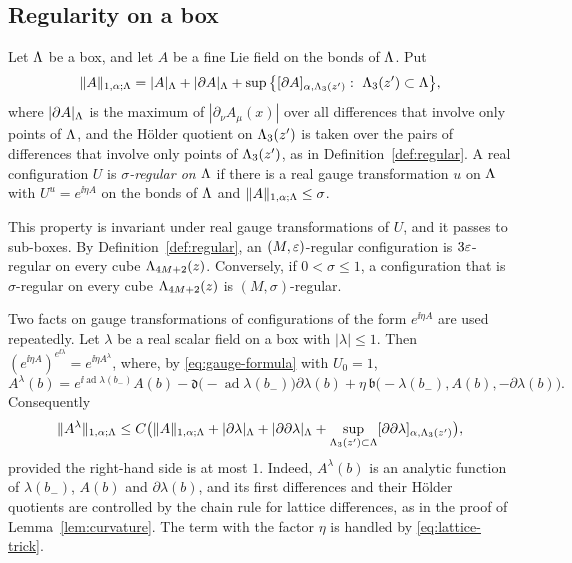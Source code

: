 \subsection{Regularity on a box}\label{ss:28.1}

\begin{definition}\label{def:box-regular}
Let $\Lambda$ be a box, and let $A$ be a fine Lie field on the bonds of $\Lambda$. Put
\[
\|A\|_{1,\alpha;\Lam}=|A|_\Lam+|\partial A|_\Lam+\sup\big\{\Hol{\partial A}{\Lam_3(z')}:\ \Lam_3(z')\subset\Lam\big\},
\]
where $|\partial A|_\Lambda$ is the maximum of $|\partial_\nu A_\mu(x)|$ over all differences that involve only points of $\Lambda$, and the H\"older quotient on $\Lambda_3(z')$ is taken over the pairs of differences that involve only points of $\Lambda_3(z')$, as in Definition~\ref{def:regular}. A real configuration $U$ is \emph{$\sigma$-regular on $\Lambda$} if there is a real gauge transformation $u$ on $\Lambda$ with $U^u=e^{\ii\eta A}$ on the bonds of $\Lambda$ and $\|A\|_{1,\alpha;\Lambda}\le\sigma$.
\end{definition}

This property is invariant under real gauge transformations of $U$, and it passes to sub-boxes. By Definition~\ref{def:regular}, an $(M,\varepsilon)$-regular configuration is $3\varepsilon$-regular on every cube $\Lambda_{4M+2}(z)$. Conversely, if $0<\sigma\le1$, a configuration that is $\sigma$-regular on every cube $\Lambda_{4M+2}(z)$ is $(M,\sigma)$-regular.

Two facts on gauge transformations of configurations of the form $e^{\ii\eta A}$ are used repeatedly. Let $\lambda$ be a real scalar field on a box with $|\lambda|\le1$. Then $(e^{\ii\eta A})^{e^{\ii\lambda}}=e^{\ii\eta A^\lambda}$, where, by \eqref{eq:gauge-formula} with $U_0=1$,
\begin{equation}\label{eq:gauge-formula-1}
A^\lambda(b)=e^{\ii\operatorname{ad}\lambda(b_-)}A(b)-\mathfrak d\big(-\operatorname{ad}\lambda(b_-)\big)\partial\lambda(b)+\eta\,\mathfrak b\big(-\lambda(b_-),A(b),-\partial\lambda(b)\big).
\end{equation}
Consequently
\begin{equation}\label{eq:gauge-bound}
\|A^\lambda\|_{1,\alpha;\Lambda}\le C\big(\|A\|_{1,\alpha;\Lambda}+|\partial\lambda|_\Lambda+|\partial\partial\lambda|_\Lambda+\sup_{\Lambda_3(z')\subset\Lambda}[\partial\partial\lambda]_{\alpha,\Lambda_3(z')}\big),
\end{equation}
provided the right-hand side is at most $1$. Indeed, $A^\lambda(b)$ is an analytic function of $\lambda(b_-)$, $A(b)$ and $\partial\lambda(b)$, and its first differences and their H\"older quotients are controlled by the chain rule for lattice differences, as in the proof of Lemma~\ref{lem:curvature}. The term with the factor $\eta$ is handled by \eqref{eq:lattice-trick}.

